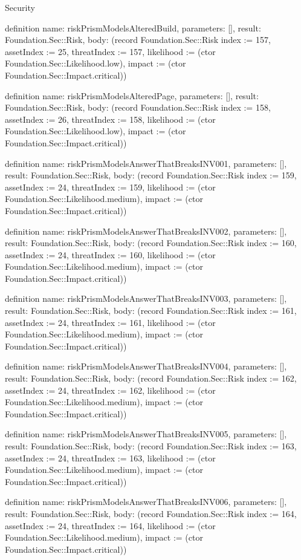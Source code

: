 \begin{lexlean}{Security}
\begin{semanticmodule}
definition{
  name: riskPrismModelsAlteredBuild,
  parameters: [],
  result: Foundation.Sec::Risk,
  body: (record Foundation.Sec::Risk {index := 157, assetIndex := 25, threatIndex := 157, likelihood := (ctor Foundation.Sec::Likelihood.low), impact := (ctor Foundation.Sec::Impact.critical)})
}

definition{
  name: riskPrismModelsAlteredPage,
  parameters: [],
  result: Foundation.Sec::Risk,
  body: (record Foundation.Sec::Risk {index := 158, assetIndex := 26, threatIndex := 158, likelihood := (ctor Foundation.Sec::Likelihood.low), impact := (ctor Foundation.Sec::Impact.critical)})
}

definition{
  name: riskPrismModelsAnswerThatBreaksINV001,
  parameters: [],
  result: Foundation.Sec::Risk,
  body: (record Foundation.Sec::Risk {index := 159, assetIndex := 24, threatIndex := 159, likelihood := (ctor Foundation.Sec::Likelihood.medium), impact := (ctor Foundation.Sec::Impact.critical)})
}

definition{
  name: riskPrismModelsAnswerThatBreaksINV002,
  parameters: [],
  result: Foundation.Sec::Risk,
  body: (record Foundation.Sec::Risk {index := 160, assetIndex := 24, threatIndex := 160, likelihood := (ctor Foundation.Sec::Likelihood.medium), impact := (ctor Foundation.Sec::Impact.critical)})
}

definition{
  name: riskPrismModelsAnswerThatBreaksINV003,
  parameters: [],
  result: Foundation.Sec::Risk,
  body: (record Foundation.Sec::Risk {index := 161, assetIndex := 24, threatIndex := 161, likelihood := (ctor Foundation.Sec::Likelihood.medium), impact := (ctor Foundation.Sec::Impact.critical)})
}

definition{
  name: riskPrismModelsAnswerThatBreaksINV004,
  parameters: [],
  result: Foundation.Sec::Risk,
  body: (record Foundation.Sec::Risk {index := 162, assetIndex := 24, threatIndex := 162, likelihood := (ctor Foundation.Sec::Likelihood.medium), impact := (ctor Foundation.Sec::Impact.critical)})
}

definition{
  name: riskPrismModelsAnswerThatBreaksINV005,
  parameters: [],
  result: Foundation.Sec::Risk,
  body: (record Foundation.Sec::Risk {index := 163, assetIndex := 24, threatIndex := 163, likelihood := (ctor Foundation.Sec::Likelihood.medium), impact := (ctor Foundation.Sec::Impact.critical)})
}

definition{
  name: riskPrismModelsAnswerThatBreaksINV006,
  parameters: [],
  result: Foundation.Sec::Risk,
  body: (record Foundation.Sec::Risk {index := 164, assetIndex := 24, threatIndex := 164, likelihood := (ctor Foundation.Sec::Likelihood.medium), impact := (ctor Foundation.Sec::Impact.critical)})
}


\end{semanticmodule}
\end{lexlean}
